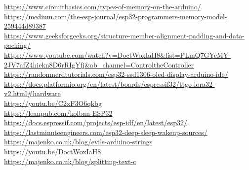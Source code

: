 \documentclass[11pt,a4paper]{article}
\numberwithin{equation}{section}   %
\numberwithin{figure}{section}     %
\numberwithin{table}{section}      %
\begin{document}
\url{https://www.circuitbasics.com/types-of-memory-on-the-arduino/}\\[4pt]
\url{https://medium.com/the-esp-journal/esp32-programmers-memory-model-259444d89387}\\[4pt]
\url{https://www.geeksforgeeks.org/structure-member-alignment-padding-and-data-packing/}\\[4pt]
\url{https://www.youtube.com/watch?v=DoctWoxIaH8&list=PLmQ7GYcMY-2JV7afZ4hiekn8D6rRIgYfj&ab_channel=ControltheController}\\[4pt]
\url{https://randomnerdtutorials.com/esp32-ssd1306-oled-display-arduino-ide/}\\[4pt]
\url{https://docs.platformio.org/en/latest/boards/espressif32/ttgo-lora32-v2.html#hardware}\\[4pt]
\url{https://youtu.be/C2xF3O6qkbg}\\[4pt]
\url{https://leanpub.com/kolban-ESP32}\\[4pt]
\url{https://docs.espressif.com/projects/esp-idf/en/latest/esp32/}\\[4pt]
\url{https://lastminuteengineers.com/esp32-deep-sleep-wakeup-sources/}\\[4pt]
\url{https://majenko.co.uk/blog/evils-arduino-strings}\\[4pt]
\url{https://youtu.be/DoctWoxIaH8}\\[4pt]
\url{https://majenko.co.uk/blog/splitting-text-c}

\nocite{*}   %
\printbibliography[heading=bibintoc]
\end{document}

